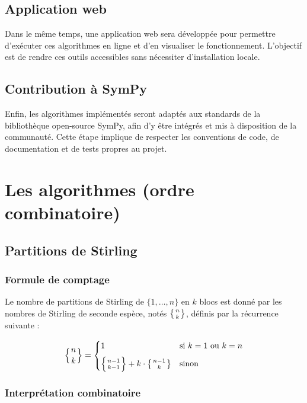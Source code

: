 \documentclass[12pt, a4paper]{report}
\begin{document}
\section{Application web}

Dans le m\^eme temps, une application web sera d\'evelopp\'ee pour permettre
d'ex\'ecuter ces algorithmes en ligne et d'en visualiser le fonctionnement.
L'objectif est de rendre ces outils accessibles sans n\'ecessiter d'installation
locale.

\section{Contribution \`a SymPy}

Enfin, les algorithmes impl\'ement\'es seront adapt\'es aux standards de la
biblioth\`eque open-source SymPy, afin d'y \^etre int\'egr\'es et mis \`a
disposition de la communaut\'e. Cette \'etape implique de respecter les conventions
de code, de documentation et de tests propres au projet.

\chapter{Les algorithmes (ordre combinatoire)}

\section{Partitions de Stirling}

\subsection{Formule de comptage}

Le nombre de partitions de Stirling de $\{1, \ldots, n\}$ en $k$ blocs est donn\'e
par les nombres de Stirling de seconde esp\`ece, not\'es $\left\{n \atop k\right\}$,
d\'efinis par la r\'ecurrence suivante :

\[
  \left\{n \atop k\right\} =
  \begin{cases}
    1 & \text{si } k = 1 \text{ ou } k = n \\[6pt]
    \left\{n-1 \atop k-1\right\} + k \cdot \left\{n-1 \atop k\right\}
      & \text{sinon}
  \end{cases}
\]

\subsection{Interpr\'etation combinatoire}
\end{document}
